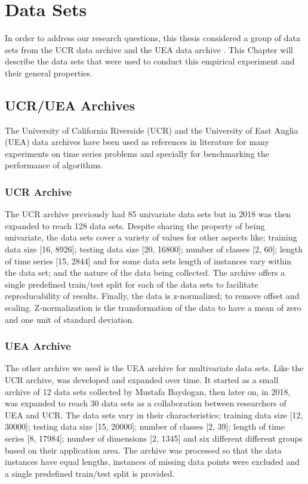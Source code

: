 \chapter{Data Sets}
\label{Chapter data sets}
In order to address our research questions, this thesis considered a group of  data sets from the UCR data archive \cite{UCRArchive2018} and the UEA data archive \cite{bagnall2018uea}.
This Chapter will describe the  data sets that were used to conduct this empirical experiment and their general properties.

\section{UCR/UEA Archives}
\label{DataArchives}
The University of California Riverside (UCR) and the University of East Anglia (UEA) data archives have been used as references in literature for many experiments on time series problems \cite{abanda2019review,fawaz2020inceptiontime,bagnall2017great,yazdanbakhsh2019multivariate,ruiz2020great,fawaz2019deepreview}
and specially for benchmarking the performance of algorithms.

\subsection{UCR Archive}
\label{UCR}
The UCR archive previously had 85 univariate data sets but in 2018 was then expanded to reach 128 data sets.
Despite sharing the property of being univariate, the data sets cover a variety of values for other aspects like;
training data size [16, 8926]; testing data size [20, 16800]; number of classes [2, 60]; length of time series [15, 2844] and for some data sets length of instances vary within the data set;
and the nature of the data being collected. The archive offers a single predefined train/test split for each of the data sets to facilitate reproducability of results.
Finally, the data is z-normalized; to remove offset and scaling. Z-normalization is the transformation of the data to have a mean of zero and one unit of standard deviation.

\subsection{UEA Archive}
\label{UEA}
The other archive we used is the UEA archive for multivariate data sets. Like the UCR archive, was developed and expanded over time.
It started as a small archive of 12 data sets collected by Mustafa Baydogan,
then later on, in 2018, was expanded to reach 30 data sets as a collaboration between researchers of UEA and UCR. The data sets vary in their characteristics;
training data size [12, 30000]; testing data size [15, 20000]; number of classes [2, 39]; length of time series [8, 17984]; number of dimensions [2, 1345] and six different different groups based on their application area.
The archive was processed so that the data instances have equal lengths, instances of missing data points were excluded and a single predefined train/test split is provided.

